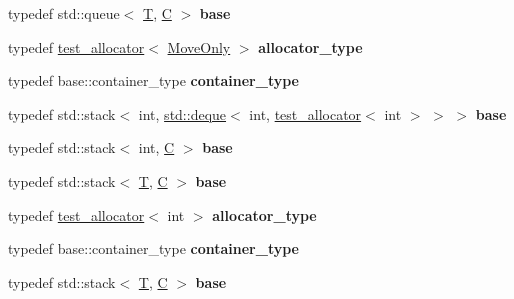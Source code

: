 \begin{DoxyCompactItemize}
\item 
\mbox{\label{structtest_a9487e8c7d7e14c14936c3d5278f51354}} 
typedef std\+::queue$<$ \mbox{\hyperlink{struct_t}{T}}, \mbox{\hyperlink{struct_c}{C}} $>$ {\bfseries base}
\item 
\mbox{\label{structtest_a0daf173ec406459788a2e32d28ea6592}} 
typedef \mbox{\hyperlink{classtest__allocator}{test\+\_\+allocator}}$<$ \mbox{\hyperlink{class_move_only}{Move\+Only}} $>$ {\bfseries allocator\+\_\+type}
\item 
\mbox{\label{structtest_a73247bd60092d6e305cfa4fe71ba65a8}} 
typedef base\+::container\+\_\+type {\bfseries container\+\_\+type}
\item 
\mbox{\label{structtest_ada781e583b3b0e1c43fd6263fd35fe86}} 
typedef std\+::stack$<$ int, \mbox{\hyperlink{classstd_1_1deque}{std\+::deque}}$<$ int, \mbox{\hyperlink{classtest__allocator}{test\+\_\+allocator}}$<$ int $>$ $>$ $>$ {\bfseries base}
\item 
\mbox{\label{structtest_a83dd9e9401823c135a2a28d2e664f594}} 
typedef std\+::stack$<$ int, \mbox{\hyperlink{struct_c}{C}} $>$ {\bfseries base}
\item 
\mbox{\label{structtest_a9321c07cf59bfdba1c346b59def490bc}} 
typedef std\+::stack$<$ \mbox{\hyperlink{struct_t}{T}}, \mbox{\hyperlink{struct_c}{C}} $>$ {\bfseries base}
\item 
\mbox{\label{structtest_ac503282f2bb91da46e782df80b9cef81}} 
typedef \mbox{\hyperlink{classtest__allocator}{test\+\_\+allocator}}$<$ int $>$ {\bfseries allocator\+\_\+type}
\item 
\mbox{\label{structtest_a73247bd60092d6e305cfa4fe71ba65a8}} 
typedef base\+::container\+\_\+type {\bfseries container\+\_\+type}
\item 
\mbox{\label{structtest_a9321c07cf59bfdba1c346b59def490bc}} 
typedef std\+::stack$<$ \mbox{\hyperlink{struct_t}{T}}, \mbox{\hyperlink{struct_c}{C}} $>$ {\bfseries base}
\item 
\mbox{\label{structtest_a0daf173ec406459788a2e32d28ea6592}} 

\end{DoxyCompactItemize}
